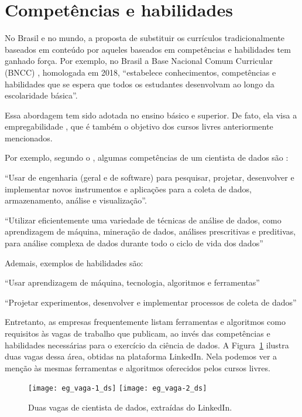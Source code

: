 \section{Competências e habilidades}\label{sec:hc}

No Brasil e no mundo, a proposta de substituir os currículos tradicionalmente baseados em conteúdo por aqueles baseados em competências e habilidades tem ganhado força.
Por exemplo, no Brasil a Base Nacional Comum Curricular (BNCC) \cite{BNCC}, homologada em 2018, ``estabelece conhecimentos, competências e habilidades que se espera que todos os estudantes desenvolvam ao longo da escolaridade básica''.

Essa abordagem tem sido adotada no ensino básico \cite{Avila2017} e superior.
De fato, ela visa a empregabilidade \cite{Butova2015}, que é também o objetivo dos cursos livres anteriormente mencionados.

Por exemplo, segundo o , algumas competências de um cientista de dados são \cite{CF-DS-Release2019}:
\begin{compactitem}
	\item ``Usar de engenharia (geral e de software) para pesquisar, projetar, desenvolver e implementar novos instrumentos e aplicações para a coleta de dados, armazenamento, análise e visualização''.
	\item ``Utilizar eficientemente uma variedade de técnicas de análise de dados, como aprendizagem de máquina, mineração de dados, análises prescritivas e preditivas, para análise complexa de dados durante todo o ciclo de vida dos dados''
\end{compactitem}

Ademais, exemplos de habilidades são:
\begin{compactitem}
	\item ``Usar aprendizagem de máquina, tecnologia, algoritmos e ferramentas''
	\item ``Projetar experimentos, desenvolver e implementar processos de coleta de dados''
\end{compactitem}

Entretanto, as empresas frequentemente listam ferramentas e algoritmos como requisitos às vagas de trabalho que publicam, ao invés das competências e habilidades necessárias para o exercício da ciência de dados.
A Figura~\ref{fig:vagas} ilustra duas vagas dessa área, obtidas na plataforma LinkedIn.
Nela podemos ver a menção às mesmas ferramentas e algoritmos oferecidos pelos cursos livres.

\begin{figure}
	\texttt{[image: eg\_vaga-1\_ds]}\hfill
	\texttt{[image: eg\_vaga-2\_ds]}
	\caption{Duas vagas de cientista de dados, extraídas do LinkedIn.}
	\label{fig:vagas}
\end{figure}